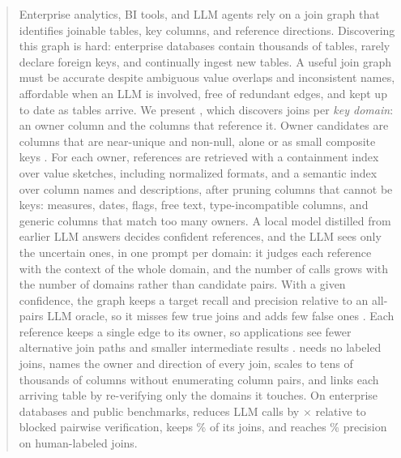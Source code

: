 \begin{abstract}
Enterprise analytics, BI tools, and LLM agents rely on a join graph that identifies joinable tables, key columns, and reference directions. Discovering this graph is hard: enterprise databases contain thousands of tables, rarely declare foreign keys, and continually ingest new tables.
A useful join graph must be accurate despite ambiguous value overlaps and inconsistent names, affordable when an LLM is involved, free of redundant edges, and kept up to date as tables arrive.
We present \ourmethod, which discovers joins per \emph{key domain}: an owner column and the columns that reference it.
Owner candidates are columns that are near-unique and non-null, alone or as small composite keys .
For each owner, references are retrieved with a containment index over value sketches, including normalized formats, and a semantic index over column names and descriptions, after pruning columns that cannot be keys: measures, dates, flags, free text, type-incompatible columns, and generic columns that match too many owners.
A local model distilled from earlier LLM answers decides confident references, and the LLM sees only the uncertain ones, in one prompt per domain: it judges each reference with the context of the whole domain, and the number of calls grows with the number of domains rather than candidate pairs.
With a given confidence, the graph keeps a target recall and precision relative to an all-pairs LLM oracle, so it misses few true joins and adds few false ones . Each reference keeps a single edge to its owner, so applications see fewer alternative join paths and smaller intermediate results .
\ourmethod needs no labeled joins, names the owner and direction of every join, scales to tens of thousands of columns without enumerating column pairs, and links each arriving table by re-verifying only the domains it touches.
On  enterprise databases and public benchmarks, \ourmethod reduces LLM calls by $\times$ relative to blocked pairwise verification, keeps \% of its joins, and reaches \% precision on human-labeled joins.
\end{abstract}


